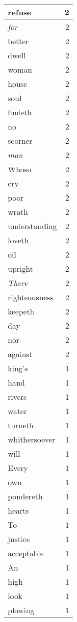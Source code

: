 \begin{center}
\begin{longtable}{l|r}
refuse & 2\\ \hline 
\emph{for} & 2\\ \hline 
better & 2\\ \hline 
dwell & 2\\ \hline 
woman & 2\\ \hline 
house & 2\\ \hline 
soul & 2\\ \hline 
findeth & 2\\ \hline 
no & 2\\ \hline 
scorner & 2\\ \hline 
\emph{man} & 2\\ \hline 
Whoso & 2\\ \hline 
cry & 2\\ \hline 
poor & 2\\ \hline 
wrath & 2\\ \hline 
understanding & 2\\ \hline 
loveth & 2\\ \hline 
oil & 2\\ \hline 
upright & 2\\ \hline 
\emph{There} & 2\\ \hline 
righteousness & 2\\ \hline 
keepeth & 2\\ \hline 
day & 2\\ \hline 
nor & 2\\ \hline 
against & 2\\ \hline 
king's & 1\\ \hline 
hand & 1\\ \hline 
rivers & 1\\ \hline 
water & 1\\ \hline 
turneth & 1\\ \hline 
whithersoever & 1\\ \hline 
will & 1\\ \hline 
Every & 1\\ \hline 
own & 1\\ \hline 
pondereth & 1\\ \hline 
hearts & 1\\ \hline 
To & 1\\ \hline 
justice & 1\\ \hline 
acceptable & 1\\ \hline 
An & 1\\ \hline 
high & 1\\ \hline 
look & 1\\ \hline 
plowing & 1\\ \hline 

\end{longtable}
\end{center}
